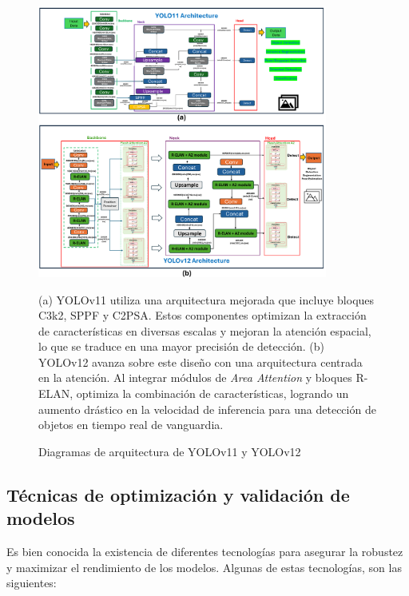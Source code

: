 \documentclass[12pt,a4paper,onecolumn,oneside]{report}
\begin{document}
\begin{figure}[htbp]
  \centering
  \includegraphics[width=0.85\textwidth]{figuras/arquitecture YOLO/v11_v12.png}
  \caption{Diagramas de arquitectura de YOLOv11 y YOLOv12}
  \label{fig:Yolov11_v12_arquitectures}
  (a) YOLOv11 utiliza una arquitectura mejorada que incluye bloques C3k2, SPPF y C2PSA. Estos componentes optimizan la extracción de características en diversas escalas y mejoran la atención espacial, lo que se traduce en una mayor precisión de detección.
  (b) YOLOv12 avanza sobre este diseño con una arquitectura centrada en la atención. Al integrar módulos de \textit{Area Attention} y bloques R-ELAN, optimiza la combinación de características, logrando un aumento drástico en la velocidad de inferencia para una detección de objetos en tiempo real de vanguardia.
\end{figure}

\subsection{Técnicas de optimización y validación de modelos}

Es bien conocida la existencia de diferentes tecnologías para asegurar la robustez y maximizar el rendimiento de los modelos. Algunas de estas tecnologías, son las siguientes:
\end{document}
